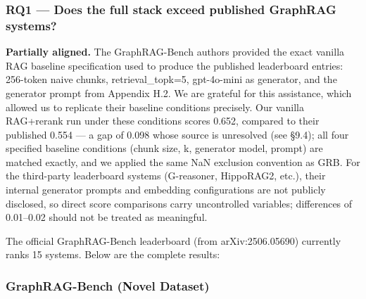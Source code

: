 \subsubsection{RQ1 --- Does the full stack exceed published GraphRAG systems?}\label{rq1-does-the-full-stack-exceed-published-graphrag-systems}

\textbf{Partially aligned.} The GraphRAG-Bench authors provided the exact vanilla RAG baseline specification used to produce the published leaderboard entries: 256-token naive chunks, retrieval\_topk=5, gpt-4o-mini as generator, and the generator prompt from Appendix H.2. We are grateful for this assistance, which allowed us to replicate their baseline conditions precisely. Our vanilla RAG+rerank run under these conditions scores 0.652, compared to their published 0.554 --- a gap of 0.098 whose source is unresolved (see §9.4); all four specified baseline conditions (chunk size, k, generator model, prompt) are matched exactly, and we applied the same NaN exclusion convention as GRB. For the third-party leaderboard systems (G-reasoner, HippoRAG2, etc.), their internal generator prompts and embedding configurations are not publicly disclosed, so direct score comparisons carry uncontrolled variables; differences of 0.01--0.02 should not be treated as meaningful.

The official GraphRAG-Bench leaderboard (from arXiv:2506.05690) currently ranks 15 systems. Below are the complete results:

\subsubsection{GraphRAG-Bench (Novel Dataset)}\label{graphrag-bench-novel-dataset}

